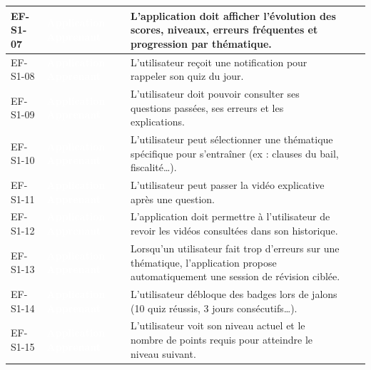 \begin{longtable}{|P{1.75cm}|P{2.65cm}|P{7.45cm}|P{1.80cm}|P{1.55cm}|}
EF-S1-07 & \textcolor{white}{\textbf{Application Apprenant}} & L’application doit afficher l’évolution des scores, niveaux, erreurs fréquentes et progression par thématique. &  &  \\ \hline
EF-S1-08 & \textcolor{white}{\textbf{Application Apprenant}} & L’utilisateur reçoit une notification pour rappeler son quiz du jour. &  &  \\ \hline
EF-S1-09 & \textcolor{white}{\textbf{Application Apprenant}} & L’utilisateur doit pouvoir consulter ses questions passées, ses erreurs et les explications. &  &  \\ \hline
EF-S1-10 & \textcolor{white}{\textbf{Application Apprenant}} & L’utilisateur peut sélectionner une thématique spécifique pour s’entraîner (ex : clauses du bail, fiscalité…). &  &  \\ \hline
EF-S1-11 & \textcolor{white}{\textbf{Application Apprenant}} & L’utilisateur peut passer la vidéo explicative après une question. &  &  \\ \hline
EF-S1-12 & \textcolor{white}{\textbf{Application Apprenant}} & L’application doit permettre à l’utilisateur de revoir les vidéos consultées dans son historique. &  &  \\ \hline
EF-S1-13 & \textcolor{white}{\textbf{Application Apprenant}} & Lorsqu’un utilisateur fait trop d’erreurs sur une thématique, l’application propose automatiquement une session de révision ciblée. &  &  \\ \hline
EF-S1-14 & \textcolor{white}{\textbf{Application Apprenant}} & L’utilisateur débloque des badges lors de jalons (10 quiz réussis, 3 jours consécutifs…). &  &  \\ \hline
EF-S1-15 & \textcolor{white}{\textbf{Application Apprenant}} & L’utilisateur voit son niveau actuel et le nombre de points requis pour atteindre le niveau suivant. &  &  \\ \hline

\end{longtable}
